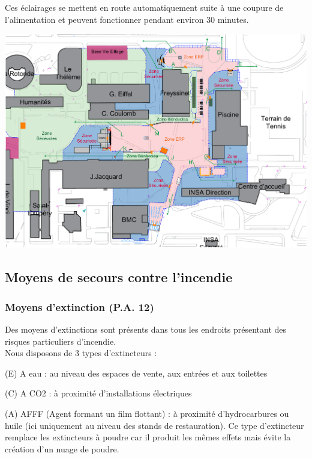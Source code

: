 \documentclass[hidelinks, paper=a4, fontsize=13pt]{report}
\begin{document}
Ces éclairages se mettent en route automatiquement suite à une coupure de l’alimentation et peuvent fonctionner pendant environ 30 minutes. 


\begin{center}
	\includegraphics[width=.8\textwidth,keepaspectratio]{Exports/Plan_24h_44eme-Blocs_Phares}
\end{center}


\subsection{Moyens de secours contre l’incendie}
\label{moyensSecoursIncendie}
\subsubsection{Moyens d’extinction (P.A. 12)}

Des moyens d’extinctions sont présents dans tous les endroits présentant des risques particuliers d’incendie.\\
Nous disposons de 3 types d’extincteurs :
\begin{list}{•}{}
	\item (E) A eau : au niveau des espaces de vente, aux entrées et aux toilettes
	\item (C) A CO2 : à proximité d’installations électriques 
	\item (A) AFFF (Agent formant un film flottant) : à proximité d’hydrocarbures ou huile (ici uniquement au niveau des stands de restauration). Ce type d’extincteur remplace les extincteurs à poudre car il produit les mêmes effets mais évite la création d’un nuage de poudre.
\end{list} \mbox{}\\
\end{document}
